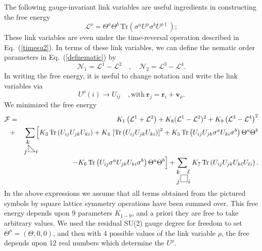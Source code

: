 \documentclass[aps,prb,preprint,onecolumn,citeautoscript,superscriptaddress,footinbib,
eqsecnum]{revtex4-1}
\newcommand{\beq}{\begin{equation}}
\newcommand{\eeq}{\end{equation}}
\def\bea{\begin{eqnarray}}
\def\eea{\end{eqnarray}}
\newcommand{\nn}{\nonumber \\}
\begin{document}
The following gauge-invariant link variables are useful ingredients in constructing the free energy 
\begin{equation}
    \mathcal{L}^\rho = \Theta^a \Theta^b \, \mbox{Tr} (\sigma^a U^\rho \sigma^b U^{\rho\dagger} ) ;
\end{equation}
These link variables are even under the time-reversal operation described in Eq.~(\ref{timesu2}). In terms 
of these link variables, we can define the nematic order parameters in Eq.~(\ref{defnematic})
by
\beq 
\mathcal{N}_1 = \mathcal{L}^1 - \mathcal{L}^2 \quad , \quad \mathcal{N}_2 = \mathcal{L}^3
- \mathcal{L}^4. \label{nematicU}
\eeq  
In writing the free energy, it is useful to change notation and write the link variables via 
\beq 
U^\rho (i) \rightarrow U_{ij} \quad, \mbox{with}~{\bm r}_j = {\bm r}_i + {\bm v}_\rho. \label{latticeij}
\eeq
We minimized the free energy
\bea
\mathcal{F} &=& K_1 \left(\mathcal{L}^1 + \mathcal{L}^2\right)
+ K_8 (\mathcal{L}^1 - \mathcal{L}^2) ^2 + K_9 \left( \mathcal{L}^3
- \mathcal{L}^4\right)^2
\nn 
&+&
\sum_{\setlength\unitlength{0.5pt}
\begin{picture}(35,40)
\put(12,4){\line(1,0){20}}
\put(12,4){\line(0,1){20}}
\put(12,24){\line(1,-1){20}}
\put(34,0){\small $i$}
\put(0,0){\small $j$}
\put(6,27){\small $k$}
\end{picture}}
\Bigl[
K_3 \, \mbox{Tr} \left( U_{ij} U_{jk} U_{ki} \right) + K_4 \, \left[\mbox{Tr} \left( U_{ij} U_{jk} U_{ki} \right)\right]^2 + K_5 \, \mbox{Tr} \left( U_{ij} U_{jk} \sigma^a U_{ki} \sigma^b \right)
\Theta^a  \Theta^b \nn
&~&~~~- K_6 \, \mbox{Tr} \left( U_{ij} \sigma^a U_{jk}  U_{ki} \sigma^b \right)
\Theta^a  \Theta^b   \Bigr] +
\sum_{\setlength\unitlength{0.5pt}
\begin{picture}(35,40)
\put(12,4){\line(1,0){20}}
\put(12,4){\line(0,1){20}}
\put(12,24){\line(1,0){20}}
\put(32,4){\line(0,1){20}}
\put(34,0){\small $i$}
\put(0,0){\small $j$}
\put(0,27){\small $k$}
\put(31,27){\small $\ell$}
\end{picture}}~
 K_7 \, \mbox{Tr} \left( U_{ij} U_{jk} U_{k\ell} U_{\ell i} \right).
 \label{FU}
\eea
In the above expressions we assume that all terms obtained from the pictured symbols by square lattice symmetry 
operations have been summed over. This free energy depends upon 9 parameters $K_{1-9}$, and a priori they are
free to take arbitrary values. We used the residual SU(2)
gauge degree for freedom to set $\Theta^a = (\Theta, 0, 0)$, and then with 4 possible  values of the link variable
$\rho$, the free depends upon 12 real numbers which determine the $U^\rho$.
\end{document}
